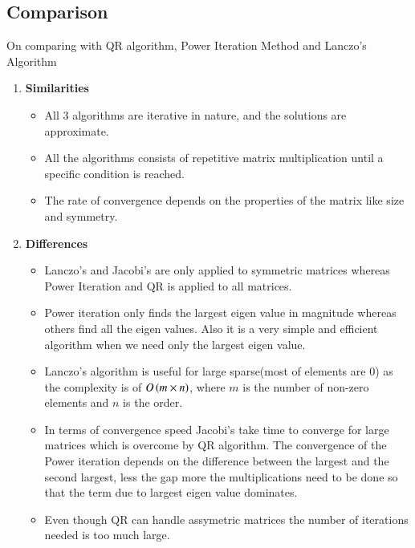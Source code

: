 \documentclass[journal,12pt,onecolumn]{IEEEtran}
\theoremstyle{remark}
\begin{document}
\subsection{Comparison}
On comparing with QR algorithm, Power Iteration Method and Lanczo's Algorithm\\
\begin{enumerate}
    \item \textbf{Similarities}\\
    \begin{itemize}
        \item All $3$ algorithms are iterative in nature, and the solutions are approximate.\\
        \item All the algorithms consists of repetitive matrix multiplication until a specific condition is reached.\\
        \item The rate of convergence depends on the properties of the matrix like size and symmetry.\\
    \end{itemize}
    \item \textbf{Differences}\\
    \begin{itemize}
        \item Lanczo's and Jacobi's are  only applied to symmetric matrices whereas Power Iteration and QR is applied to all matrices.\\
        \item Power iteration only finds the largest eigen value in magnitude whereas others find all the eigen values. Also it is a very simple and efficient algorithm when we need only the largest eigen value.\\
        \item Lanczo's algorithm is useful for large sparse(most of elements are $0$) as the complexity is of $O\left(m \times n\right)$, where $m$ is the number of non-zero elements and $n$ is the order.\\
        \item In terms of convergence speed Jacobi's take time to converge for large matrices which is overcome by QR algorithm. The convergence of the Power iteration depends on the difference between the largest and the second largest, less the gap more the  multiplications need to be done so that the term due to largest eigen value dominates.\\
        \item Even though QR can handle assymetric matrices the number of iterations needed is too much large.\\
    \end{itemize}
\end{enumerate}
\end{document}
